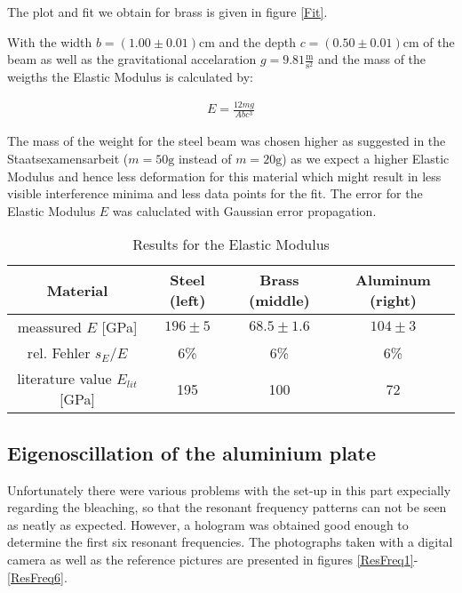 The plot and fit we obtain for brass is given in figure \ref{Fit}.


With the width  $b=(1.00\pm0.01)\mathrm{cm}$ and the depth  $c=(0.50\pm0.01)\mathrm{cm}$ of the beam as well as the gravitational accelaration $g=9.81\frac{\mathrm{m}}{\mathrm{s}^2}$ and the mass of the weigths the Elastic Modulus is calculated by: 

\begin{align}
E=\frac{12mg}{Abc^3}
\end{align}

The mass of the weight for the steel beam was chosen higher as suggested in the Staatsexamensarbeit \cite{staat} ($m=50\mathrm{g}$ instead of $m=20\mathrm{g}$) as we expect a higher Elastic Modulus and hence less deformation for this material  which might result in less visible interference minima and less data points for the fit.
The error for the Elastic Modulus $E$ was caluclated with Gaussian error propagation.

\begin{table}[h!]
	\centering
	\begin{tabular}{c|c|c|c}
		Material							& Steel (left)	& Brass (middle)	& Aluminum (right)\\ \hline\hline
		meassured $E$ [GPa]			& $196\pm5$	& $68.5\pm1.6$			& $104\pm3$			\\ \hline
		rel. Fehler $s_E/E$				& $6$\%			& $6$\%				& $6$\%				\\ \hline
	literature value \cite{staat} $E_{lit}$ [GPa]	& 195			& 100				& 72
	\end{tabular}
	\caption{Results for the Elastic Modulus}
\end{table}

\subsection{Eigenoscillation of the aluminium plate}

Unfortunately there were various problems with the set-up in this part expecially regarding the bleaching, so that the resonant frequency patterns can not be seen as neatly as expected. However, a hologram was obtained good enough to determine the first six resonant frequencies. The photographs taken with a digital camera as well as the reference pictures are presented in figures \ref{ResFreq1}-\ref{ResFreq6}.

